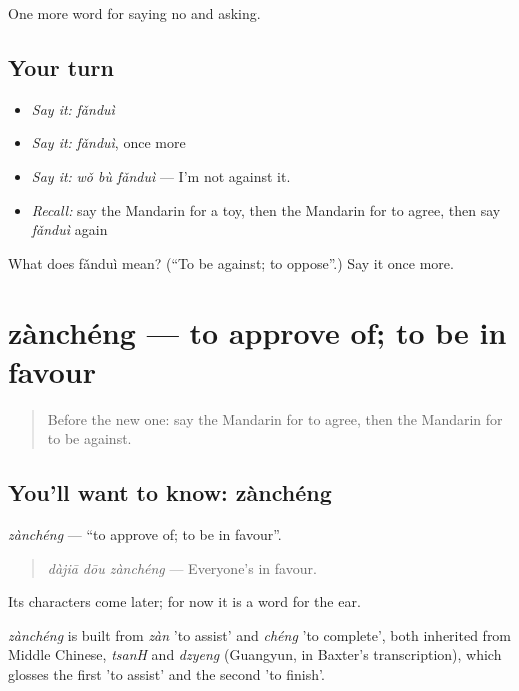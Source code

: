 \begin{grammarlens}[title={What you've built}]
One more word for saying no and asking.
\end{grammarlens}

\subsection*{Your turn}
\begin{itemize}
\raggedright
  \item \emph{Say it:} \emph{fǎnduì}
  \item \emph{Say it:} \emph{fǎnduì}, once more
  \item \emph{Say it:} \emph{wǒ bù fǎnduì} — I'm not against it.
  \item \emph{Recall:} say the Mandarin for a toy, then the Mandarin for to agree, then say \emph{fǎnduì} again
\end{itemize}

\begin{tcolorbox}[breakable,colback=teal!4,colframe=teal!35!black,title={Before you move on}]
What does fǎnduì mean? (\textquotedblleft{}To be against; to oppose\textquotedblright{}.) Say it once more.
\end{tcolorbox}
\section[zànchéng]{zànchéng — to approve of; to be in favour}

\label{lesson:ZH-C270-zancheng}



\begin{quote}
Before the new one: say the Mandarin for to agree, then the Mandarin for to be against.
\end{quote}

\subsection*{You'll want to know: zànchéng}
\emph{zànchéng} — \textquotedblleft{}to approve of; to be in favour\textquotedblright{}.

\begin{quote}
\emph{dàjiā dōu zànchéng} — Everyone's in favour.
\end{quote}

Its characters come later; for now it is a word for the ear.

\begin{cousinweb}
\emph{zànchéng} is built from \emph{zàn} 'to assist' and \emph{chéng} 'to complete', both inherited from Middle Chinese, \emph{tsanH} and \emph{dzyeng} (Guangyun, in Baxter's transcription), which glosses the first 'to assist' and the second 'to finish'.
\end{cousinweb}

